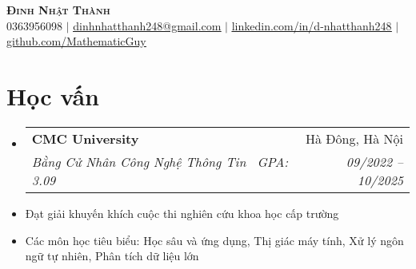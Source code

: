 \documentclass[letterpaper,11pt]{article}
\makeatletter
\newcommand{\resumeItem}[1]{
	\item\small{
	{#1 \vspace{-2pt}}
	}
}
\newcommand{\resumeSubheading}[4]{
	\vspace{-2pt}\item
	\begin{tabular*}{0.97\textwidth}[t]{l@{\extracolsep{\fill}}r}
		\textbf{#1} & #2 \\
		\textit{\small#3} & \textit{\small #4} \\
	\end{tabular*}\vspace{-7pt}
}
\newcommand{\resumeSubHeadingListStart}{\begin{itemize}[leftmargin=0.15in, label={}]}
\newcommand{\resumeSubHeadingListEnd}{\end{itemize}}
\makeatother
\begin{document}

\begin{center}
    \textbf{\Huge \scshape Đinh Nhật Thành} \\ \vspace{1pt}
    \small 0363956098 $|$ \href{mailto:x@x.com}{\underline{dinhnhatthanh248@gmail.com}} $|$
    \href{https://linkedin.com/in/...}{\underline{linkedin.com/in/d-nhatthanh248}} $|$
    \href{https://github.com/...}{\underline{github.com/MathematicGuy}}
\end{center}


\section{Học vấn}
	\resumeSubHeadingListStart
	\resumeSubheading
		{CMC University} {Hà Đông, Hà Nội}
		{Bằng Cử Nhân Công Nghệ Thông Tin \textbar \ GPA: 3.09}{09/2022 -- 10/2025}
		\resumeItem{Đạt giải khuyến khích cuộc thi nghiên cứu khoa học cấp trường}
		\resumeItem{Các môn học tiêu biểu: Học sâu và ứng dụng, Thị giác máy tính, Xử lý ngôn ngữ tự nhiên, Phân tích dữ liệu lớn}
	\resumeSubHeadingListEnd

\end{document}
